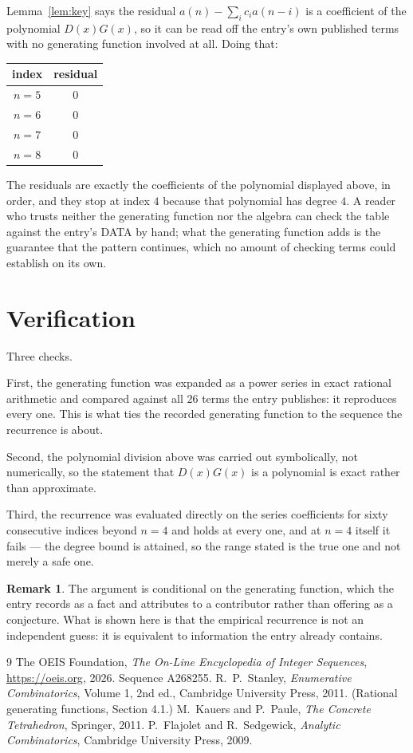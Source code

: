 \documentclass[11pt,a4paper]{article}
\theoremstyle{plain}
\theoremstyle{definition}
\newtheorem{remark}[theorem]{Remark}
\begin{document}
Lemma~\ref{lem:key} says the residual $a(n)-\sum_ic_ia(n-i)$ is a coefficient of the
polynomial $D(x)G(x)$, so it can be read off the entry's own published terms with no
generating function involved at all. Doing that:
\begin{center}
\begin{tabular}{cc}
index & residual \\ \hline
$n=5$ & $0$ \\
$n=6$ & $0$ \\
$n=7$ & $0$ \\
$n=8$ & $0$
\end{tabular}
\end{center}
The residuals are exactly the coefficients of the polynomial displayed above, in order, and
they stop at index $4$ because that polynomial has degree $4$. A reader who trusts
neither the generating function nor the algebra can check the table against the entry's DATA
by hand; what the generating function adds is the guarantee that the pattern continues, which
no amount of checking terms could establish on its own.

\section{Verification}

Three checks.

First, the generating function was expanded as a power series in exact rational arithmetic and
compared against all $26$ terms the entry publishes: it reproduces every one. This is
what ties the recorded generating function to the sequence the recurrence is about.

Second, the polynomial division above was carried out symbolically, not numerically, so the
statement that $D(x)G(x)$ is a polynomial is exact rather than approximate.

Third, the recurrence was evaluated directly on the series coefficients for sixty consecutive
indices beyond $n=4$ and holds at every one, and at $n=4$ itself it fails --- the
degree bound is attained, so the range stated is the true one and not merely a safe one.

\begin{remark}
The argument is conditional on the generating function, which the entry records as a fact and
attributes to a contributor rather than offering as a conjecture. What is shown here is that
the empirical recurrence is not an independent guess: it is equivalent to information the
entry already contains.
\end{remark}

\begin{thebibliography}{9}
 The OEIS Foundation, \emph{The On-Line Encyclopedia of Integer
Sequences}, \url{https://oeis.org}, 2026. Sequence A268255.
 R.~P.~Stanley, \emph{Enumerative Combinatorics}, Volume 1, 2nd ed.,
Cambridge University Press, 2011. (Rational generating functions, Section 4.1.)
 M.~Kauers and P.~Paule, \emph{The Concrete Tetrahedron}, Springer, 2011.
 P.~Flajolet and R.~Sedgewick, \emph{Analytic Combinatorics}, Cambridge
University Press, 2009.
\end{thebibliography}
\end{document}
